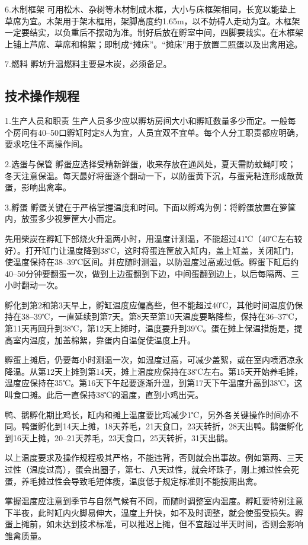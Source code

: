 \documentclass{ctexbook}
\begin{document}
6.木制框架 可用松木、杂树等木材制成木框，大小与床框架相同，长宽以能垫上草席为宜。木架用于架木框用，架脚高度约1.65m，以不妨碍人走动为宜。木框架一定要结实，以负重后不摆动为准。制好后放在孵室中间，四脚要栽实。在木框架上铺上芦席、草席和棉絮；即制成“摊床”。“摊床”用于放置二照蛋以及出禽用途。

7.燃料 孵坊升温燃料主要是木炭，必须备足。
\subsection{技术操作规程}
1.生产人员和职责 生产人员多少应以孵坊房间大小和孵缸数量多少而定。一般每个房间有40--50口孵缸时定8人为宜，人员宜双不宜单。每个人分工职责都应明确，要求吃住不离操作间。

2.选蛋与保管 孵蛋应选择受精新鲜蛋，收来存放在通风处，夏天需防蚊蝇叮咬；冬天注意保温。每天最好将蛋逐个翻动一下，以防蛋黄下沉，与蛋壳粘连形成散黄蛋，影响出禽率。

3.孵蛋 孵蛋关键在于严格掌握温度和时间。下面以孵鸡为例：将孵蛋放置在箩筐内，放蛋多少视箩筐大小而定。

先用柴炭在孵缸下部烧火升温两小时，用温度计测温，不能超过41℃（40℃左右较好）。打开缸门让温度降到38℃，这时将蛋连筐放入缸内，盖上缸盖，关闭缸门，使温度保持在38--39℃区间。并应随时测温，以防温度过高或过低。孵蛋下缸后约40--50分钟要翻蛋一次，做到上边蛋翻到下边，中间蛋翻到边上，以后每隔两、三小时翻动一次。

孵化到第2和第3天早上，孵缸温度应偏高些，但不能超过40℃，其他时间温度仍保持在38--39℃，一直延续到第7天。第8天至第10天温度要略降些，保持在36--37℃，第11天再回升到38℃，第12天上摊时，温度要升到39℃。蛋在摊上保温措施是，提高室内温度，加盖棉絮，靠蛋内自温促使温度上升。

孵蛋上摊后，仍要每小时测温一次，如温度过高，可减少盖絮，或在室内喷洒凉永降温。从第12天上摊到第14天，摊上温度应保持在38℃左右。第15天开始养毛摊，温度应保持在35℃。第16天下午起要逐渐升温，到第17天下午温度升高到38℃，这叫食口摊。此后一直保持38℃的温度，直到小鸡出壳。

鸭、鹅孵化期比鸡长，缸内和摊上温度要比鸡减少1℃，另外各关键操作时间亦不同。鸭蛋孵化到14天上摊，18天养毛，21天食口，23天转折，28天出鸭。鹅蛋孵化到16天上摊，20--21天养毛，23天食口，25天转折，31天出鹅。

以上温度要求及操作规程极其严格，不能违背，否则就会出事故。例如第两、三天过性（温度过高），蛋会出圈子，第七、八天过性，就会坏珠子，刚上摊过性会死蛋，养毛摊过性会导致毛短体瘦，温度低于规定标准则不能按期出禽。

掌握温度应注意到季节与自然气候有不同，而随时调整室内温度。孵缸要特别注意下半夜，此时缸内火脚易伸大，温度上升快，如不及时调整，就会使蛋受损失。孵蛋上摊前，如未达到技术标准，可以推迟上摊，但不宜超过半天时间，否则会影响雏禽质量。
\end{document}
